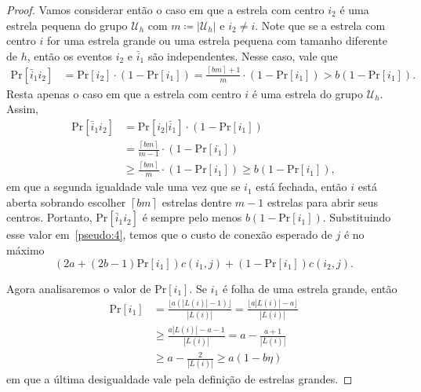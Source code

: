 \begin{proof}
    Vamos considerar então o caso em que a estrela com centro $i_2$ é uma estrela pequena do grupo $\mathcal{U}_h$ com $m \coloneqq |\mathcal{U}_h|$ e $i_2 \neq i$. Note que se a estrela com centro $i$ for uma estrela grande ou uma estrela pequena com tamanho diferente de $h$, então os eventos $i_2$ e $\bar{i}_1$ são independentes. Nesse caso, vale que 
    \begin{align}
        \text{Pr}[\bar{i}_1i_2] &= \text{Pr}[i_2] \cdot (1 - \text{Pr}[i_1]) 
         = \frac{\left \lceil bm \right \rceil + 1}{m} \cdot (1 - \text{Pr}[i_1]) > b (1 - \text{Pr}[i_1]) \nonumber.
    \end{align}
    Resta apenas o caso em que a estrela com centro $i$ é uma estrela do grupo $\mathcal{U}_h$. Assim,
    \begin{align}
        \text{Pr}[\bar{i}_1i_2] &= \text{Pr}[i_2| \bar{i}_1] \cdot (1 - \text{Pr}[i_1]) \nonumber \\
        & = \frac{\left \lceil bm \right \rceil}{m - 1 } \cdot (1 - \text{Pr}[i_1]) \nonumber \\
        & \geq \frac{\left \lceil bm \right \rceil}{m} \cdot (1 - \text{Pr}[i_1]) \geq b (1 - \text{Pr}[i_1]), \nonumber
    \end{align}
    em que a segunda igualdade vale uma vez que se $i_1$ está fechada, então $i$ está aberta sobrando escolher $\left \lceil bm \right \rceil$ estrelas dentre $m -1 $ estrelas para abrir seus centros. Portanto, Pr$[\bar{i}_1i_2]$ é sempre pelo menos $b (1 - \text{Pr}[i_1])$. Substituindo esse valor em~\eqref{pseudo:4}, temos que o custo de conexão esperado de $j$ é no máximo
    \begin{equation}
        (2a + (2b -1) \text{Pr}[i_1])c(i_1,j) + (1 - \text{Pr}[i_1])c(i_2,j). \label{pseudo:5}
    \end{equation}

    Agora analisaremos o valor de Pr$[i_1]$. Se $i_1$ é folha de uma estrela grande, então
    \begin{align}
        \text{Pr}[i_1] &= \frac{\lfloor a (|L(i)| - 1) \rfloor}{|L(i)|}  = \frac{\lfloor  a|L(i)| - a \rfloor}{|L(i)|}\nonumber \\
        &\geq \frac{a |L(i)| - a - 1}{|L(i)|} = a - \frac{a+1}{|L(i)|} \nonumber \\
        &\geq a - \frac{2}{|L(i)|} \geq a (1 - b\eta)\nonumber
    \end{align}
    em que a última desigualdade vale pela definição de estrelas grandes.


\end{proof}

